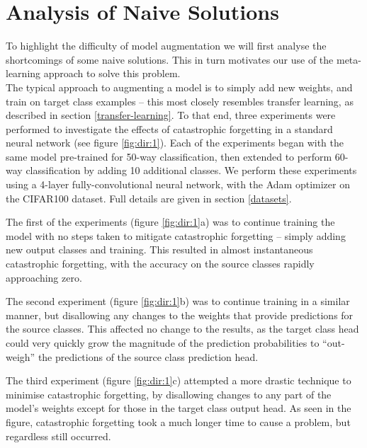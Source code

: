 \documentclass{report}
\begin{document}
\section{Analysis of Naive Solutions}
To highlight the difficulty of model augmentation we will first analyse the shortcomings of some naive solutions. This in turn motivates our use of the meta-learning approach to solve this problem. \\
The typical approach to augmenting a model is to simply add new weights, and train on target class examples -- this most closely resembles transfer learning, as described in section \ref{transfer-learning}. To that end, three experiments were performed to investigate the effects of catastrophic forgetting in a standard neural network (see figure \ref{fig:dir:1}). Each of the experiments began with the same model pre-trained for 50-way classification, then extended to perform 60-way classification by adding 10 additional classes. We perform these experiments using a 4-layer fully-convolutional neural network, with the Adam optimizer on the CIFAR100 dataset. Full details are given in section \ref{datasets}. \par
The first of the experiments (figure \ref{fig:dir:1}a) was to continue training the model with no steps taken to mitigate catastrophic forgetting -- simply adding new output classes and training. This resulted in almost instantaneous catastrophic forgetting, with the accuracy on the source classes rapidly approaching zero. \par
The second experiment (figure \ref{fig:dir:1}b) was to continue training in a similar manner, but disallowing any changes to the weights that provide predictions for the source classes. This affected no change to the results, as the target class head could very quickly grow the magnitude of the prediction probabilities to ``out-weigh'' the predictions of the source class prediction head. \par
The third experiment (figure \ref{fig:dir:1}c) attempted a more drastic technique to minimise catastrophic forgetting, by disallowing changes to any part of the model's weights except for those in the target class output head. As seen in the figure, catastrophic forgetting took a much longer time to cause a problem, but regardless still occurred. \par
\end{document}
